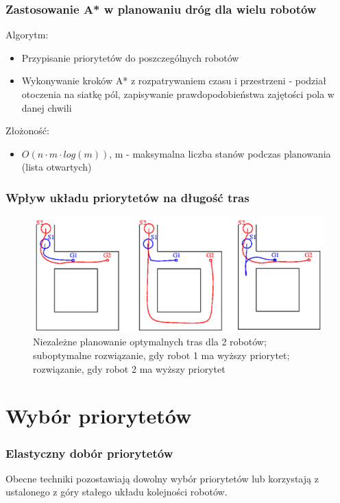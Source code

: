 \subsubsection{Zastosowanie A* w planowaniu dróg dla wielu robotów}
Algorytm:
\begin{itemize}
	\item Przypisanie priorytetów do poszczególnych robotów
	\item Wykonywanie kroków A* z rozpatrywaniem czasu i przestrzeni - podział otoczenia na siatkę pól, zapisywanie prawdopodobieństwa zajętości pola w danej chwili
\end{itemize}
Złożoność:
\begin{itemize}
	\item $O(n \cdot m \cdot log(m))$, m - maksymalna liczba stanów podczas planowania (lista otwartych) %
\end{itemize}

\subsubsection{Wpływ układu priorytetów na długość tras}
\begin{figure}[htp]
	\centering
	\includegraphics[width=\textwidth,height=0.6\textheight,keepaspectratio]{img/article1/ppt6}
	\caption{Niezależne planowanie optymalnych tras dla 2 robotów; suboptymalne rozwiązanie, gdy robot 1 ma wyższy priorytet; rozwiązanie, gdy robot 2 ma wyższy priorytet}
\end{figure}

\section{Wybór priorytetów}
\subsubsection{Elastyczny dobór priorytetów}
Obecne techniki pozostawiają dowolny wybór priorytetów lub korzystają z ustalonego z góry stałego układu kolejności robotów. \\

